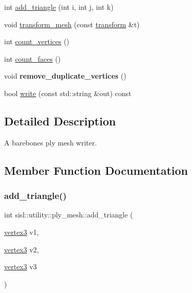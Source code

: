 \begin{DoxyCompactItemize}
\item 
int \hyperlink{classsisl_1_1utility_1_1ply__mesh_a1cee19476c65b8f721d763116f7ed792}{add\+\_\+triangle} (int i, int j, int k)
\item 
void \hyperlink{classsisl_1_1utility_1_1ply__mesh_ae7b3db5e9e4d147f8b9c971691b416eb}{transform\+\_\+mesh} (const \hyperlink{namespacesisl_a2ef12d285ca3e626c05abbdec1f8a679}{transform} \&t)
\item 
int \hyperlink{classsisl_1_1utility_1_1ply__mesh_a4deac3d136ba76fface8b15fa3446728}{count\+\_\+vertices} ()
\item 
int \hyperlink{classsisl_1_1utility_1_1ply__mesh_a0457bbece84efba494f74b4b7bb87d82}{count\+\_\+faces} ()
\item 
\mbox{\label{classsisl_1_1utility_1_1ply__mesh_aca9982449cf061ef0938f5435d577771}} 
void {\bfseries remove\+\_\+duplicate\+\_\+vertices} ()
\item 
bool \hyperlink{classsisl_1_1utility_1_1ply__mesh_a4fce9e2a1f3d81b2243465d305164205}{write} (const std\+::string \&out) const
\end{DoxyCompactItemize}


\subsection{Detailed Description}
A barebones ply mesh writer. 

\subsection{Member Function Documentation}
\mbox{\label{classsisl_1_1utility_1_1ply__mesh_a70f823f9e4642b7bd58af145c097cfb3}} 
\subsubsection{\texorpdfstring{add\+\_\+triangle()}{add\_triangle()}\hspace{0.1cm}{\footnotesize\ttfamily [1/2]}}
{\footnotesize\ttfamily int sisl\+::utility\+::ply\+\_\+mesh\+::add\+\_\+triangle (\begin{DoxyParamCaption}\item[{\hyperlink{structsisl_1_1vertex3}{vertex3}}]{v1,  }\item[{\hyperlink{structsisl_1_1vertex3}{vertex3}}]{v2,  }\item[{\hyperlink{structsisl_1_1vertex3}{vertex3}}]{v3 }\end{DoxyParamCaption})\hspace{0.3cm}{\ttfamily [inline]}}

